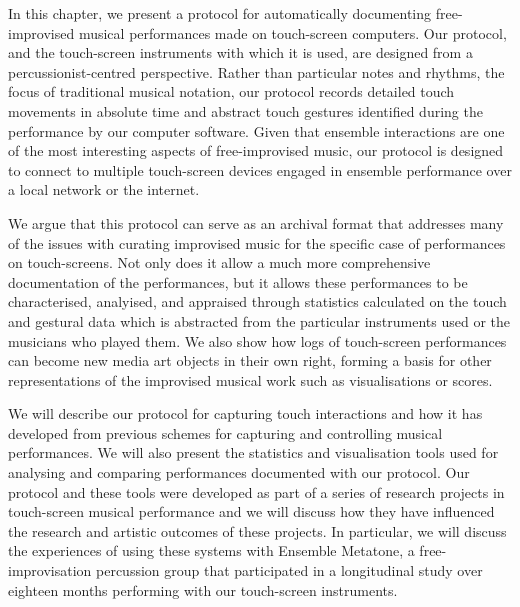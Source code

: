 \documentclass[graybox]{svmult}
\begin{document}
In this chapter, we present a protocol for automatically documenting
free-improvised musical performances made on touch-screen computers.
Our protocol, and the touch-screen instruments with which it is used,
are designed from a percussionist-centred perspective. Rather than
particular notes and rhythms, the focus of traditional musical
notation, our protocol records detailed touch movements in absolute
time and abstract touch gestures identified during the performance by our
computer software. Given that ensemble interactions are one of the
most interesting aspects of free-improvised music, our protocol is designed
to connect to multiple touch-screen devices engaged in ensemble
performance over a local network or the internet.

We argue that this protocol can serve as an archival format that
addresses many of the issues with curating improvised music for the
specific case of performances on touch-screens. Not only does it allow
a much more comprehensive documentation of the performances, but it
allows these performances to be characterised, analyised, and
appraised through statistics calculated on the touch and gestural data
which is abstracted from the particular instruments used or the
musicians who played them. We also show how logs of touch-screen
performances can become new media art objects in their own right,
forming a basis for other representations of the improvised musical
work such as visualisations or scores.

We will describe our protocol for capturing touch interactions and how
it has developed from previous schemes for capturing and controlling
musical performances. We will also present the statistics and
visualisation tools used for analysing and comparing performances
documented with our protocol. Our protocol and these tools were
developed as part of a series of research projects in touch-screen
musical performance and we will discuss how they have influenced the
research and artistic outcomes of these projects. In particular, we
will discuss the experiences of using these systems with Ensemble
Metatone, a free-improvisation percussion group that participated in a
longitudinal study over eighteen months performing with our
touch-screen instruments.


\end{document}
